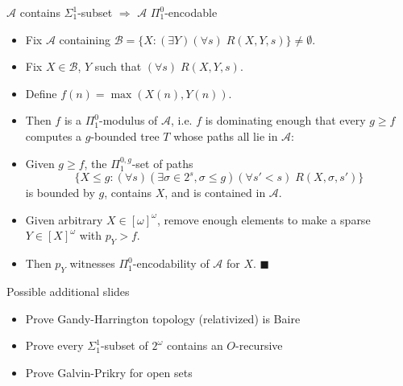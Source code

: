 \begin{frame}{$\mathcal{A}$ contains $\Sigma_1^1$-subset
$\Rightarrow$ $\mathcal{A}$ $\Pi_1^0$-encodable}
  \begin{itemize}
    \item Fix $\mathcal{A}$ containing $\mathcal{B} =\{X: (\exists
      Y)(\forall s)\; R(X,Y,s)\} \neq\emptyset$.
    \item Fix $X\in\mathcal{B}$, $Y$ such that $(\forall s)\;R(X,Y,s)$.
    \item Define $f(n)=\max(X(n),Y(n))$.
    \item Then $f$ is a $\Pi_1^0$-modulus of $\mathcal{A}$, i.e. $f$ is
      dominating enough that every $g\geq f$ computes a $g$-bounded tree
      $T$ whose paths all lie in $\mathcal{A}$:
    \item Given $g\geq f$, the $\Pi_1^{0,g}$-set of paths
      \[\{X\leq g:(\forall s)(\exists \sigma\in 2^s, \sigma\leq g)(\forall
      s'<s)\; R(X,\sigma,s')\}\]
      is bounded by $g$, contains $X$, and is contained in $\mathcal{A}$.
    \item Given arbitrary $X\in[\omega]^\omega$, remove enough elements to
      make a sparse $Y\in[X]^\omega$ with $p_Y>f$.
    \item Then $p_Y$ witnesses $\Pi_1^0$-encodability of $\mathcal{A}$ for
      $X$. $\blacksquare$
  \end{itemize}
\end{frame}

\begin{frame}{Possible additional slides}
  \begin{itemize}
    \item Prove Gandy-Harrington topology (relativized) is Baire
    \item Prove every $\Sigma_1^1$-subset of $2^\omega$ contains an
      $O$-recursive
    \item Prove Galvin-Prikry for open sets
  \end{itemize}
\end{frame}
